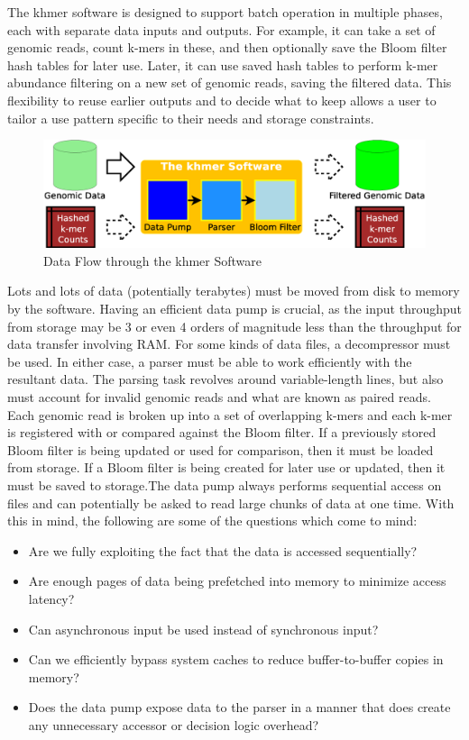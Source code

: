 \documentclass{article}
\newcommand{\comment}[2]{#2}
\begin{document}
The khmer software is designed to support batch operation in multiple phases, each with separate data inputs and outputs. For example, it can take a set of genomic reads, count k-mers in these, and then optionally save the Bloom filter hash tables for later use. Later, it can use saved hash tables to perform k-mer abundance filtering on a new set of genomic reads, saving the filtered data. This flexibility to reuse earlier outputs and to decide what to keep allows a user to tailor a use pattern specific to their needs and storage constraints.

\begin{figure}[ht!]
\centering
\includegraphics[scale=0.4]{data_flow.eps}
\caption{Data Flow through the khmer Software}
\label{khmerDataFlow}
\end{figure}

Lots and lots of data (potentially terabytes) must be moved from disk to memory by the software. Having an efficient data pump is crucial, as the input throughput from storage may be 3 or even 4 orders of magnitude less than the throughput for data transfer involving RAM. For some kinds of data files, a decompressor must be used. In either case, a parser must be able to work efficiently with the resultant data. The parsing task revolves around variable-length lines, but also must account for invalid genomic reads and what are known as paired reads. Each genomic read is broken up into a set of overlapping k-mers and each k-mer is registered with or compared against the Bloom filter. If a previously stored Bloom filter is being updated or used for comparison, then it must be loaded from storage. If a Bloom filter is being created for later use or updated, then it must be saved to storage.\comment{Refer explicitly to the figure.}

The data pump always performs sequential access on files and can potentially be asked to read large chunks of data at one time. With this in mind, the following are some of the questions which come to mind:
\begin{itemize}
\item Are we fully exploiting the fact that the data is accessed sequentially?
\item Are enough pages of data being prefetched into memory to minimize access latency?
\item Can asynchronous input be used instead of synchronous input?
\item Can we efficiently bypass system caches to reduce buffer-to-buffer copies in memory?
\item Does the data pump expose data to the parser in a manner that does create any unnecessary accessor or decision logic overhead?
\end{itemize}
\end{document}
